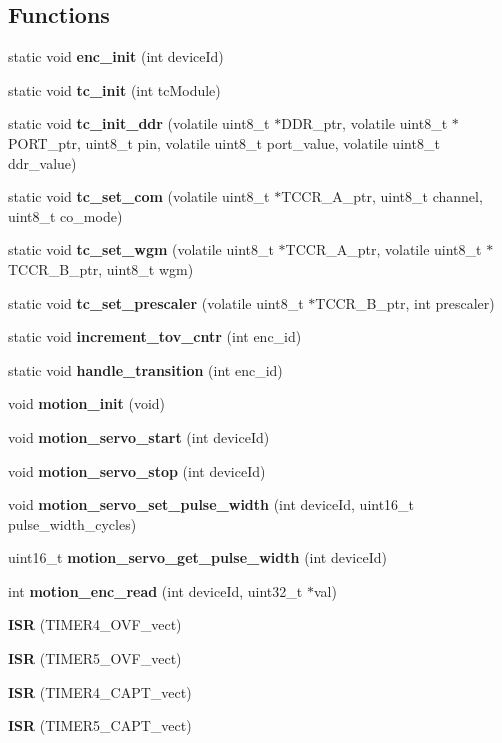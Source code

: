 \subsection*{Functions}
\begin{DoxyCompactItemize}
\item 
static void {\bf enc\+\_\+init} (int device\+Id)
\item 
static void {\bf tc\+\_\+init} (int tc\+Module)
\item 
static void {\bf tc\+\_\+init\+\_\+ddr} (volatile uint8\+\_\+t $\ast$D\+D\+R\+\_\+ptr, volatile uint8\+\_\+t $\ast$P\+O\+R\+T\+\_\+ptr, uint8\+\_\+t pin, volatile uint8\+\_\+t port\+\_\+value, volatile uint8\+\_\+t ddr\+\_\+value)
\item 
static void {\bf tc\+\_\+set\+\_\+com} (volatile uint8\+\_\+t $\ast$T\+C\+C\+R\+\_\+\+A\+\_\+ptr, uint8\+\_\+t channel, uint8\+\_\+t co\+\_\+mode)
\item 
static void {\bf tc\+\_\+set\+\_\+wgm} (volatile uint8\+\_\+t $\ast$T\+C\+C\+R\+\_\+\+A\+\_\+ptr, volatile uint8\+\_\+t $\ast$T\+C\+C\+R\+\_\+\+B\+\_\+ptr, uint8\+\_\+t wgm)
\item 
static void {\bf tc\+\_\+set\+\_\+prescaler} (volatile uint8\+\_\+t $\ast$T\+C\+C\+R\+\_\+\+B\+\_\+ptr, int prescaler)
\item 
static void {\bf increment\+\_\+tov\+\_\+cntr} (int enc\+\_\+id)
\item 
static void {\bf handle\+\_\+transition} (int enc\+\_\+id)
\item 
void {\bf motion\+\_\+init} (void)
\item 
void {\bf motion\+\_\+servo\+\_\+start} (int device\+Id)
\item 
void {\bf motion\+\_\+servo\+\_\+stop} (int device\+Id)
\item 
void {\bf motion\+\_\+servo\+\_\+set\+\_\+pulse\+\_\+width} (int device\+Id, uint16\+\_\+t pulse\+\_\+width\+\_\+cycles)
\item 
uint16\+\_\+t {\bf motion\+\_\+servo\+\_\+get\+\_\+pulse\+\_\+width} (int device\+Id)
\item 
int {\bf motion\+\_\+enc\+\_\+read} (int device\+Id, uint32\+\_\+t $\ast$val)
\item 
{\bf I\+SR} (T\+I\+M\+E\+R4\+\_\+\+O\+V\+F\+\_\+vect)
\item 
{\bf I\+SR} (T\+I\+M\+E\+R5\+\_\+\+O\+V\+F\+\_\+vect)
\item 
{\bf I\+SR} (T\+I\+M\+E\+R4\+\_\+\+C\+A\+P\+T\+\_\+vect)
\item 
{\bf I\+SR} (T\+I\+M\+E\+R5\+\_\+\+C\+A\+P\+T\+\_\+vect)
\end{DoxyCompactItemize}
